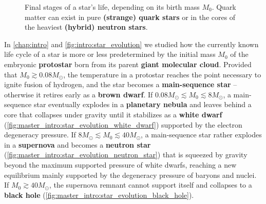 \begin{figure}[b]
\caption{\label{fig:master_intro:star_evolution_end}%
	Final stages of a star's life, depending on its birth mass $M_0$.
	Quark matter can exist in pure \textbf{(strange) quark stars}
	or in the cores of the heaviest \textbf{(hybrid) neutron stars}.
}
\end{figure}

In \cref{chap:intro} and \cref{fig:intro:star_evolution} we studied how the currently known life cycle of a star
is more or less predetermined by the initial mass $M_0$ of the embryonic \textbf{protostar} born from its parent \textbf{giant molecular cloud}.
Provided that $M_0 \gtrsim 0.08 M_\odot$, the temperature in a protostar reaches the point necessary to ignite fusion of hydrogen, and the star becomes a \textbf{main-sequence star} -- otherwise it retires early as a \textbf{brown dwarf}.
If $0.08 M_\odot \lesssim M_0 \lesssim 8 M_\odot$, a main-sequence star eventually explodes in a \textbf{planetary nebula} and leaves behind a core that collapses under gravity until it stabilizes as a \textbf{white dwarf} (\cref{fig:master_intro:star_evolution_white_dwarf}) supported by the electron degeneracy pressure.
If $8 M_\odot \lesssim M_0 \lesssim 40 M_\odot$, a main-sequence star rather explodes in a \textbf{supernova} and becomes a \textbf{neutron star} (\cref{fig:master_intro:star_evolution_neutron_star}) that is squeezed by gravity beyond the maximum supported pressure of white dwarfs, reaching a new equilibrium mainly supported by the degeneracy pressure of baryons and nuclei.
If $M_0 \gtrsim 40 M_\odot$, the supernova remnant cannot support itself and collapses to a \textbf{black hole} (\cref{fig:master_intro:star_evolution_black_hole}).


